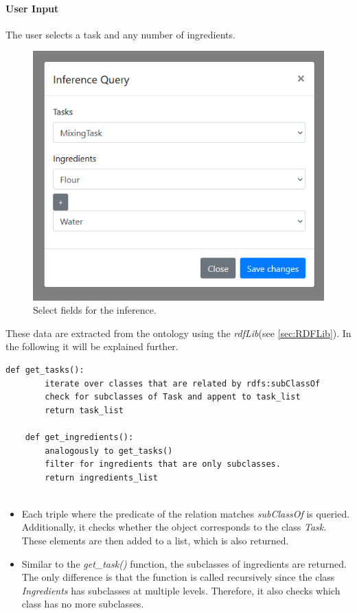 \paragraph{User Input}

The user selects a task and any number of ingredients.
\begin{figure}[H]
    \includegraphics[scale=0.45]{Graphics/inference_user_input.png}
    \caption{Select fields for the inference.}
\end{figure}
These data are extracted from the ontology using the \textit{rdfLib}(see  
\ref{sec:RDFLib}). In the following it will be explained further.

\begin{lstlisting}[caption={Task and ingredient extraction},captionpos=b]
   def get_tasks():
        iterate over classes that are related by rdfs:subClassOf
        check for subclasses of Task and appent to task_list
        return task_list

    def get_ingredients():
        analogously to get_tasks()
        filter for ingredients that are only subclasses.
        return ingredients_list


\end{lstlisting}


\begin{itemize}
    \item Each triple where the predicate of the relation matches \textit{subClassOf} is queried. Additionally, it checks whether the object corresponds to the class \textit{Task}. These elements are then added to a list, which is also returned.
    \item Similar to the \textit{get\_task()} function, the subclasses of ingredients are returned. The only difference is that the function is called recursively since the class \textit{Ingredients} has subclasses at multiple levels. Therefore, it also checks which class has no more subclasses.
\end{itemize}

